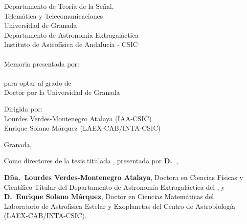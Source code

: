 	\cleardoublepage

	\begin{center}
		{\Large Departamento de Teoría de la Señal,\\
		        Telemática y Telecomunicaciones\\}
		\vspace{0.2cm}
		{\large Universidad de Granada\\}
		\vfill
		{\Large Departamento de Astronomía Extragaláctica\\}
		\vspace{0.2cm}
		{\large Instituto de Astrofísica de Andalucía - CSIC\\}
		\vfill
		{\LARGE\textbf{\thesistitle}\\}
		\vfill
		{\large Memoria presentada por:\\
				\vspace{0.5cm}
		        {\Large \thesisauthor}\\
		\vspace{0.5cm}
		para optar al grado de\\
		\vspace{0.5cm}
		{\Large Doctor por la Universidad de Granada}
		}
		
		\vfill
		{\large Dirigida por:\\
				\vspace{0.5cm}
				Lourdes Verdes-Montenegro Atalaya (IAA-CSIC)\\
				Enrique Solano Márquez (LAEX-CAB/INTA-CSIC)}
		\vfill
	\end{center}

	\vfill

	\begin{center}
		{\large Granada, \fechaDeposito}
	\end{center}
	
	\vfill

	\cleardoublepage

	\noindent Como directores de la tesis titulada \emph{\thesistitle},
	presentada por \textbf{D.~\thesisauthor},

	\vspace{0.25cm}

	\begin{adjustwidth}{1cm}{2cm}
		\noindent \textbf{Dña.~Lourdes Verdes-Montenegro Atalaya},
		Doctora en Ciencias Físicas y Científico Titular del
		Departamento de Astronomía Extragaláctica del \IAA, y
		\textbf{D.~Enrique Solano Márquez}, Doctor en Ciencias
		Matemáticas  del
		Laboratorio de Astrofísica Estelar y Exoplanetas del
		Centro de Astrobiología (LAEX-CAB/INTA-CSIC).
	\end{adjustwidth}

